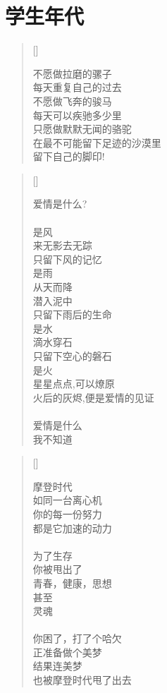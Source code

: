 \chapter{学生年代}
\thispagestyle{empty}
\renewcommand{\poemtoc}{section}
\settowidth{\versewidth}{不愿做拉磨的骡子}
\begin{verse}[\versewidth]

不愿做拉磨的骡子\\
每天重复自己的过去\\
不愿做飞奔的骏马\\
每天可以疾驰多少里\\
只愿做默默无闻的骆驼\\
在最不可能留下足迹的沙漠里\\
留下自己的脚印!
\end{verse}

\renewcommand{\poemtoc}{section}
\settowidth{\versewidth}{爱情是什么}
\begin{verse}[\versewidth]

爱情是什么?\\
~\\
是风\\
\vin  来无影去无踪\\
\vin  只留下风的记忆\\
是雨\\
\vin  从天而降\\
\vin  潜入泥中\\
\vin  只留下雨后的生命\\
是水\\
\vin  滴水穿石\\
\vin  只留下空心的磐石\\
是火\\
\vin  星星点点,可以燎原\\
\vin  火后的灰烬,便是爱情的见证\\
~\\
爱情是什么\\
我不知道\\
\end{verse}
\newpage

\renewcommand{\poemtoc}{section}
\settowidth{\versewidth}{摩登时代}
\begin{verse}[\versewidth]

摩登时代\\
如同一台离心机\\
你的每一份努力\\
都是它加速的动力\\
~\\
为了生存\\
你被甩出了\\
\vin   青春，健康，思想\\
甚至\\
\vin   灵魂\\
~\\
你困了，打了个哈欠\\
正准备做个美梦\\
结果连美梦\\
也被摩登时代甩了出去
\end{verse}

